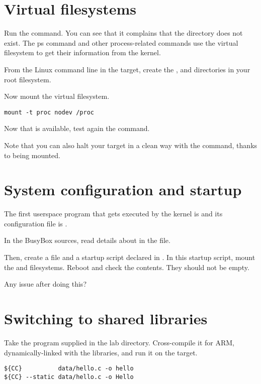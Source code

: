 \section{Virtual filesystems}

Run the  command. You can see that it complains that the
 directory does not exist. The ps command and other
process-related commands use the  virtual filesystem to get
their information from the kernel.

From the Linux command line in the target, create the ,  and
 directories in your root filesystem.

Now mount the  virtual filesystem.

\begin{verbatim}
mount -t proc nodev /proc
\end{verbatim}

 Now that  is
available, test again the  command.

Note that you can also halt your target in a clean way with the 
command, thanks to  being mounted.

\section{System configuration and startup}

The first userspace program that gets executed by the kernel is
 and its configuration file is .

In the BusyBox sources, read details about  in the
 file.

Then, create a  file and a 
startup script declared in . In this startup
script, mount the  and  filesystems.
Reboot and check the contents. They should not be empty.

Any issue after doing this?

\section{Switching to shared libraries}

Take the  program supplied in the lab 
directory. Cross-compile it for ARM, dynamically-linked with the
libraries, and run it on the target.

\begin{verbatim}
${CC}          data/hello.c -o hello
${CC} --static data/hello.c -o Hello
\end{verbatim}

